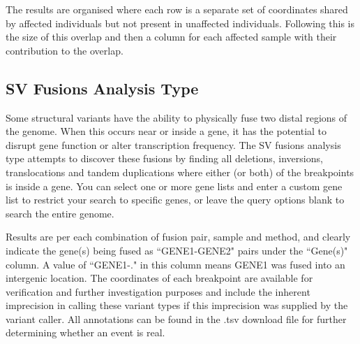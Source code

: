 \documentclass[11pt, a4paper]{article}
\begin{document}
The results are organised where each row is a separate set of coordinates shared by affected individuals but not present in unaffected individuals. Following this is the size of this overlap and then a column for each affected sample with their contribution to the overlap.

\subsection{SV Fusions Analysis Type}

Some structural variants have the ability to physically fuse two distal regions of the genome. When this occurs near or inside a gene, it has the potential to disrupt gene function or alter transcription frequency. The SV fusions analysis type attempts to discover these fusions by finding all deletions, inversions, translocations and tandem duplications where either (or both) of the breakpoints is inside a gene. You can select one or more gene lists and enter a custom gene list to restrict your search to specific genes, or leave the query options blank to search the entire genome.

Results are per each combination of fusion pair, sample and method, and clearly indicate the gene(s) being fused as ``GENE1-GENE2" pairs under the ``Gene(s)" column. A value of ``GENE1-." in this column means GENE1 was fused into an intergenic location. The coordinates of each breakpoint are available for verification and further investigation purposes and include the inherent imprecision in calling these variant types if this imprecision was supplied by the variant caller. All annotations can be found in the .tsv download file for further determining whether an event is real.

\end{document}
